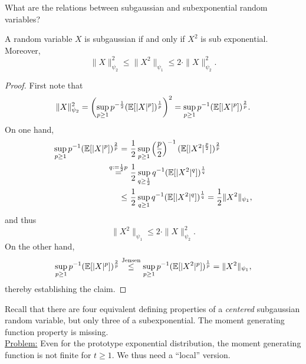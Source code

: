 What are the relations between subgaussian and subexponential random variables?
\begin{lemma}
\begin{mdframed}
A random variable $X$ is subgaussian if and only if $X^2$ is sub exponential. Moreover,
\begin{equation*}
\|X\|_{\psi_2}^2 \leq \|X^2\|_{\psi_1} \leq 2 \cdot \|X\|^2_{\psi_2}.
\end{equation*}
\end{mdframed}
\begin{proof}
First note that 
\begin{equation*}
\|X\|^2_{\psi_2} = \left(
\sup_{p\geq 1} p^{-\frac{1}{2}} (\mathbb{E}[|X|^p])^\frac{1}{p} \right)^2= \sup_{p\geq 1} p^{-1} (\mathbb{E}[|X|^p])^\frac{2}{p}.
\end{equation*}
On one hand,
\begin{equation*}
\begin{split}
\sup_{p\geq 1} p^{-1} (\mathbb{E}[|X|^p])^\frac{2}{p} = \ &\frac{1}{2} \sup_{p\geq 1} \left(\frac{p}{2}\right)^{-1} (\mathbb{E}[|X^2|^\frac{p}{2}])^\frac{2}{p} \\
\overset{q:=\frac{1}{2}p}{=} \ &\frac{1}{2} \sup_{q\geq \frac{1}{2}} q^{-1} (\mathbb{E}[|X^2|^q])^\frac{1}{q} \\
\leq \ &\frac{1}{2} \sup_{q\geq 1} q^{-1} (\mathbb{E}[|X^2|^q])^\frac{1}{q} = \frac{1}{2}\|X^2\|_{\psi_1},
\end{split}
\end{equation*}
and thus $$\|X^2\|_{\psi_1} \leq 2 \cdot \|X\|^2_{\psi_2}.$$
On the other hand,
\begin{equation*}
\begin{split}
\sup_{p\geq 1} p^{-1} (\mathbb{E}[|X|^p])^\frac{2}{p} \overset{\text{Jensen}}\leq \sup_{p\geq 1} p^{-1} (\mathbb{E}[|X^2|^p])^\frac{1}{p} = \|X^2\|_{\psi_1},
\end{split}
\end{equation*}
thereby establishing the claim.
\end{proof}
\end{lemma}
Recall that there are four equivalent defining properties of a \emph{centered} subgaussian random variable, but only three of a subexponential. The moment generating function property is missing. \vspace{0.5pc}\\ \underline{Problem:} Even for the prototype exponential distribution, the moment generating function is not finite for $t \geq 1$. We thus need a ``local'' version.
